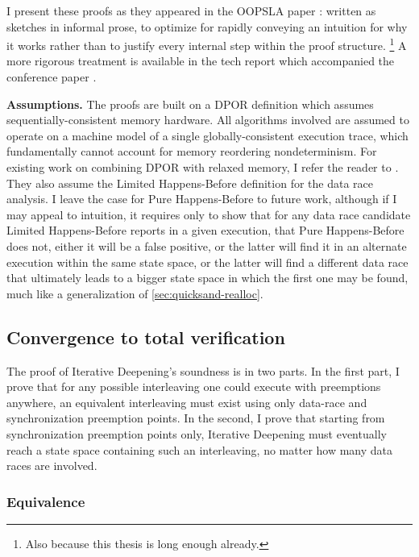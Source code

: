 I present these proofs as they appeared in the OOPSLA paper \cite{quicksand}:
written as sketches in informal prose,
to optimize for rapidly conveying an intuition for why it works
rather than to justify every internal step within the proof structure.%
\footnote{Also because this thesis is long enough already.}
A more rigorous treatment
is available in the tech report which accompanied the conference paper \cite{quicksand-soundness}.

{\bf Assumptions.}
The proofs are built on a DPOR definition which assumes sequentially-consistent memory hardware.
All algorithms involved are assumed to operate on a machine model of a single globally-consistent execution trace,
which fundamentally cannot account for memory reordering nondeterminism.
For existing work on combining DPOR with relaxed memory, I refer the reader to \cite{tsopso}.
They also assume the Limited Happens-Before definition
for the data race analysis.
I leave the case for Pure Happens-Before to future work,
although if I may appeal to intuition,
it requires only to show that for any data race candidate
Limited Happens-Before reports in a given execution,
that Pure Happens-Before does not,
either it will be a false positive,
or the latter will find it in an alternate execution within the same state space,
or the latter will find a different data race that ultimately leads to a bigger state space in which the first one may be found,
much like a generalization of \cref{sec:quicksand-realloc}.

\subsection{Convergence to total verification}
\label{sec:quicksand-convergence}

The proof of Iterative Deepening's soundness is in two parts.
In the first part, I prove that for any possible interleaving
one could execute with preemptions anywhere,
an equivalent interleaving must exist using only data-race and synchronization preemption points.
In the second, I prove that starting from synchronization preemption points only,
Iterative Deepening must eventually reach a state space containing such an interleaving,
no matter how many data races are involved.

\subsubsection{Equivalence}

